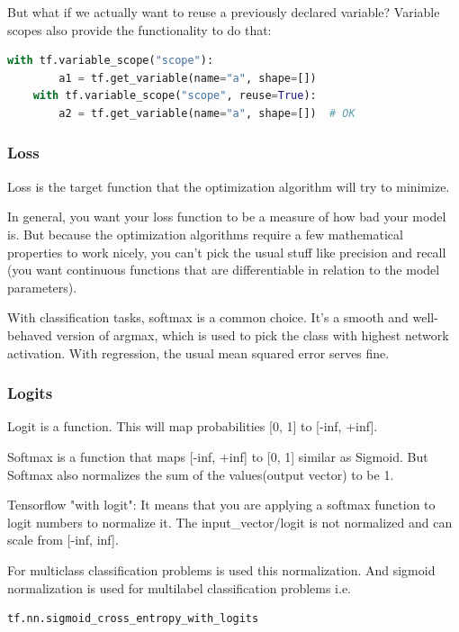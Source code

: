 But what if we actually want to reuse a previously declared variable? Variable scopes also provide the functionality to do that:

\begin{lstlisting}[language=Python]
    with tf.variable_scope("scope"):
        a1 = tf.get_variable(name="a", shape=[])
    with tf.variable_scope("scope", reuse=True):
        a2 = tf.get_variable(name="a", shape=[])  # OK
\end{lstlisting}

\subsubsection{Loss}

Loss is the target function that the optimization algorithm will try to minimize.

In general, you want your loss function to be a measure of how bad your model is. But because the optimization algorithms require a few mathematical properties to work nicely, you can't pick the usual stuff like precision and recall (you want continuous functions that are differentiable in relation to the model parameters).

With classification tasks, softmax is a common choice. It's a smooth and well-behaved version of argmax, which is used to pick the class with highest network activation. With regression, the usual mean squared error serves fine.

\subsubsection{Logits}

Logit is a function. This will map probabilities [0, 1] to [-inf, +inf].

Softmax is a function that maps [-inf, +inf] to [0, 1] similar as Sigmoid. But Softmax also normalizes the sum of the values(output vector) to be 1.

Tensorflow "with logit": It means that you are applying a softmax function to logit numbers to normalize it. The input\_vector/logit is not normalized and can scale from [-inf, inf].

For multiclass classification problems is used this normalization. And sigmoid normalization is used for multilabel classification problems i.e. 
\begin{lstlisting}[language=Python]
    tf.nn.sigmoid_cross_entropy_with_logits
\end{lstlisting}

